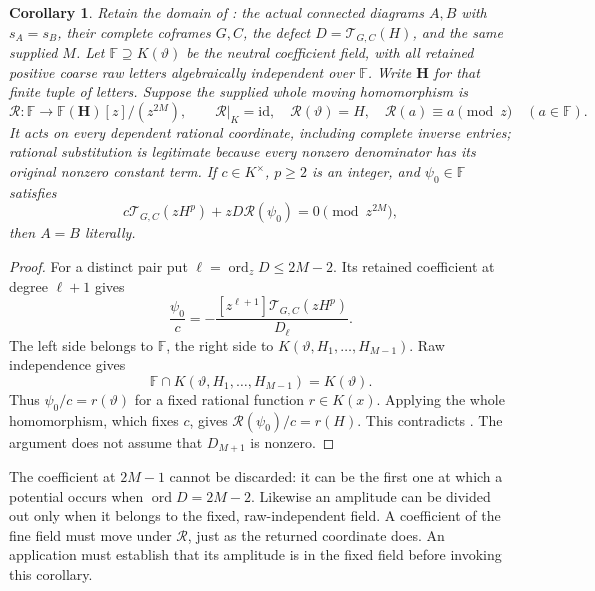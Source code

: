\documentclass[11pt,a4paper]{amsart}
\numberwithin{equation}{section}
\theoremstyle{plain}
\newtheorem{corollary}[theorem]{Corollary}
\theoremstyle{definition}
\newcommand{\ord}{\operatorname{ord}}
\begin{document}
\begin{corollary}\label{cor:stationary-field-descent}
Retain the domain of : the actual connected
diagrams \(A,B\) with \(s_A=s_B\), their complete coframes \(G,C\),
the defect \(D=\mathcal T_{G,C}(H)\), and the same supplied \(M\).
Let \(\mathbb F\supseteq K(\vartheta)\) be the neutral coefficient
field, with all retained positive coarse raw letters algebraically
independent over \(\mathbb F\).  Write \(\mathbf H\) for that finite
tuple of letters.  Suppose the supplied whole moving homomorphism is
\[
 \mathcal R:\mathbb F\longrightarrow
       \mathbb F(\mathbf H)[z]/(z^{2M}),\qquad
 \mathcal R|_K=\mathrm{id},\quad
 \mathcal R(\vartheta)=H,\quad
 \mathcal R(a)\equiv a\pmod z\quad(a\in\mathbb F).
\]
It acts on every dependent rational coordinate, including complete
inverse entries; rational substitution is legitimate because every
nonzero denominator has its original nonzero constant term.
If \(c\in K^\times\), \(p\ge2\) is an integer, and
\(\psi_0\in\mathbb F\) satisfies
\begin{equation}\label{sc:whole-field-equation}
 c\mathcal T_{G,C}(zH^p)+zD\mathcal R(\psi_0)=0
                       \pmod {z^{2M}},
\end{equation}
then \(A=B\) literally.
\end{corollary}
\begin{proof}
For a distinct pair put \(\ell=\ord_zD\le2M-2\).  Its retained coefficient
at degree \(\ell+1\) gives
\[
 \frac{\psi_0}{c}
 =-\frac{[z^{\ell+1}]\mathcal T_{G,C}(zH^p)}{D_\ell}.
\]
The left side belongs to \(\mathbb F\), the right side to
\(K(\vartheta,H_1,\ldots,H_{M-1})\).  Raw independence gives
\[
 \mathbb F\cap K(\vartheta,H_1,\ldots,H_{M-1})=K(\vartheta).
\]
Thus \(\psi_0/c=r(\vartheta)\) for a fixed rational function \(r\in K(x)\).
Applying the whole homomorphism, which fixes \(c\), gives
\(\mathcal R(\psi_0)/c=r(H)\).  This contradicts
.  The argument does not assume that
\(D_{M+1}\) is nonzero.
\end{proof}

The coefficient at \(2M-1\) cannot be discarded: it can be the first
one at which a potential occurs when \(\ord D=2M-2\).
Likewise an amplitude can be divided out only when it belongs to the
fixed, raw-independent field.  A coefficient of the fine field must
move under \(\mathcal R\), just as the returned coordinate does.
An application must establish that its amplitude is in the fixed field
before invoking this corollary.
\end{document}
